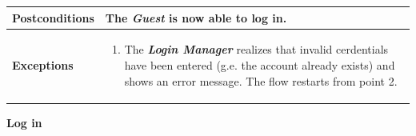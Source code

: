 \documentclass{report}
\begin{document}
\begin{tabularx}{\linewidth}{| l | X |}
	\hline
	\textbf{Postconditions} & The \textbf{\textit{Guest}} is now able to log in.\\
	
	\hline
	\textbf{Exceptions} & \parbox{0.7\textwidth}{ \begin{enumerate}
			\item The \textbf{\textit{Login Manager}} realizes that invalid cerdentials have been entered (g.e. the account already exists) and shows an error message. The flow restarts from point 2. 
		\end{enumerate}}\\

	\hline
	
\end{tabularx}


\begin{center}
	\textbf{Log in}
\end{center}
\end{document}
